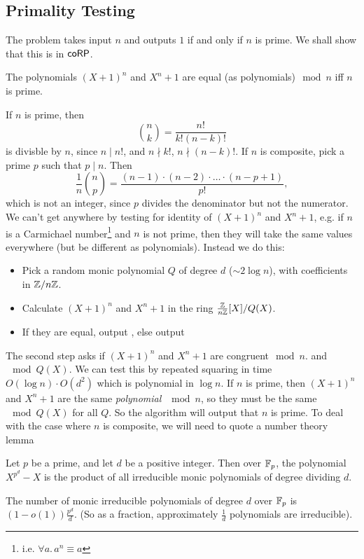\documentclass{article}
\begin{document}
\subsection{Primality Testing}
The problem takes input $n$ and outputs $1$ if and only if $n$ is prime. We shall show that this is in $\mathsf{coRP}$.
\begin{fancylem}{}
    The polynomials $(X+1)^{n}$ and $X^{n}+1$ are equal (as polynomials)$\mod n$ iff $n$ is prime.
\end{fancylem}
\proof If $n$ is prime, then \[ {n \choose k} = \frac{n!}{k!(n-k)!}\] is divisble by $n$, since $n \mid n!$, and $n \nmid k!$, $n \nmid(n-k)!$. If $n$ is composite, pick a prime $p$ such that $p \mid n$. Then \[ \frac{1}{n} {n \choose p} = \frac{(n-1) \cdot (n-2) \cdot \dots \cdot (n-p+1)}{p!}, \] which is not an integer, since $p$ divides the denominator but not the numerator. \endproof 
We can't get anywhere by testing for identity of $(X+1)^{n}$ and $X^{n}+1$, e.g. if $n$ is a Carmichael number\footnote{i.e. $\forall a.\, a^{n} \equiv a$} and $n$ is not prime, then they will take the same values everywhere (but be different as polynomials). Instead we do this: \begin{itemize}
    \item Pick a random monic polynomial $Q$ of degree $d$ ($\sim 2\log n$), with coefficients in $\mathbb{Z}/n\mathbb{Z}$.
    \item Calculate $(X+1)^{n}$ and $X^{n}+1$ in the ring $\frac{\mathbb{Z}}{n\mathbb{Z}}[X]/Q(X)$.
    \item If they are equal, output , else output 
\end{itemize}
The second step asks if $(X+1)^{n}$ and $X^{n}+1$ are congruent$\mod n$. and$\mod Q(X)$. We can test this by repeated squaring in time $O(\log n)\cdot O(d^{2})$ which is polynomial in $\log n$. \gap 
If $n$ is prime, then $(X+1)^{n}$ and $X^{n}+1$ are the same \textit{polynomial} $\mod n$, so they must be the same$\mod Q(X)$ for all $Q$. So the algorithm will output that $n$ is prime. \gap 
To deal with the case where $n$ is composite, we will need to quote a number theory lemma \begin{fancylem}{}
    Let $p$ be a prime, and let $d$ be a positive integer. Then over $\mathbb{F}_{p}$, the polynomial $X^{p^{d}}-X$ is the product of all irreducible monic polynomials of degree dividing $d$.
\end{fancylem}
\endproof 
\begin{corr}
    The number of monic irreducible polynomials of degree $d$ over $\mathbb{F}_{p}$ is $(1-o(1))\frac{p^{d}}{d}$. (So as a fraction, approximately $\frac{1}{d}$ polynomials are irreducible).
\end{corr}
\end{document}
